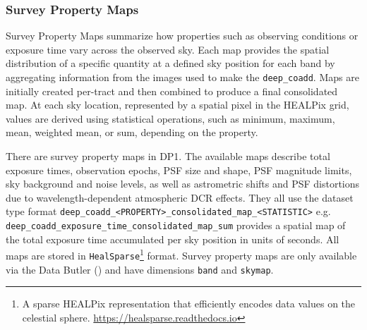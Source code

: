 \subsubsection{Survey Property Maps}
Survey Property Maps \citep{10.71929/rubin/2570315} summarize how properties such as observing conditions or exposure time vary across the observed sky.
Each map provides the spatial distribution of a specific quantity at a defined sky position for each band by aggregating information from the images used to make the \texttt{deep\_coadd}.
Maps are initially created per-\gls{tract} and then combined to produce a final consolidated map.
At each sky location, represented by a spatial pixel in the \gls{HEALPix} grid, values are derived using statistical operations, such as minimum, maximum, mean, weighted mean, or sum, depending on the property.

There are \nsurveypropertymaps survey property maps in \gls{DP1}.
The available maps describe total exposure times, observation epochs, \gls{PSF} size and \gls{shape}, \gls{PSF} magnitude limits, sky \gls{background} and noise levels, as well as astrometric shifts and \gls{PSF} distortions due to wavelength-dependent atmospheric \gls{DCR} effects.
They all use the dataset type  format \texttt{deep\_coadd\_<PROPERTY>\_consolidated\_map\_<STATISTIC>}
e.g. \texttt{deep\_coadd\_exposure\_time\_consolidated\_map\_sum} provides a spatial map of the total exposure time accumulated per
sky position in units of seconds.
All maps are stored in \texttt{HealSparse}\footnote{A sparse \gls{HEALPix}
representation that efficiently encodes data values on the celestial sphere. \url{https://healsparse.readthedocs.io}}\citep{2005ApJ...622..759G} format.
Survey property maps are only available via the Data \gls{Butler} () and  have dimensions \texttt{band} and \texttt{skymap}.

